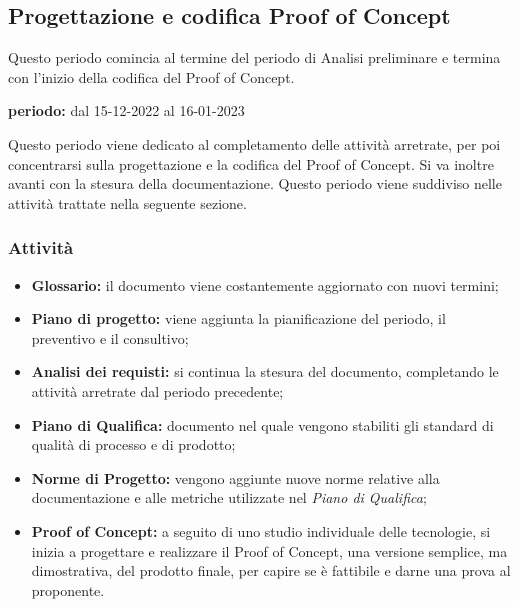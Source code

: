 \subsection{Progettazione e codifica Proof of Concept}
Questo periodo comincia al termine del periodo di Analisi preliminare e termina con l'inizio della codifica del Proof of Concept.\\
\begin{center}
\textbf{periodo:} dal 15-12-2022 al 16-01-2023\\
\end{center}
Questo periodo viene dedicato al completamento delle attività arretrate, per poi concentrarsi sulla 
progettazione e la codifica del Proof of Concept. Si va inoltre avanti con la stesura 
della documentazione. Questo periodo viene suddiviso nelle attività trattate nella seguente sezione.

\subsubsection{Attività}
\begin{itemize}
\item \textbf{Glossario:} il documento viene costantemente aggiornato con nuovi termini;
\item \textbf{Piano di progetto:} viene aggiunta la pianificazione del periodo, il preventivo e il consultivo;  
\item \textbf{Analisi dei requisti:} si continua la stesura del documento, completando le attività arretrate dal periodo precedente;
\item \textbf{Piano di Qualifica:} documento nel quale vengono stabiliti gli standard di qualità di processo e di prodotto;
\item \textbf{Norme di Progetto:} vengono aggiunte nuove norme relative alla documentazione e alle metriche utilizzate nel \textit{Piano di Qualifica};
\item \textbf{Proof of Concept:} a seguito di uno studio individuale delle tecnologie, si inizia a progettare e realizzare il Proof of Concept, una versione semplice, ma dimostrativa, del prodotto finale, per 
capire se è fattibile e darne una prova al proponente.
\end{itemize}

